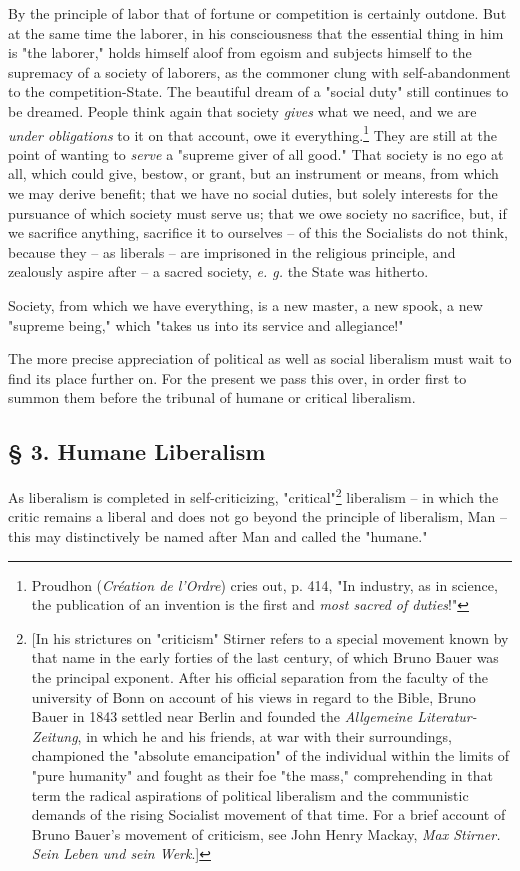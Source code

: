 By the principle of labor that of fortune or competition is certainly outdone. 
But at the same time the laborer, in his consciousness that the essential 
thing in him is "{}the laborer,"{} holds himself aloof from egoism and 
subjects himself to the supremacy of a society of laborers, as the commoner 
clung with self-abandonment to the competition-State. The beautiful dream of a 
"{}social duty"{} still continues to be dreamed. People think again that 
society \textit{gives} what we need, and we are \textit{under obligations} to 
it on that account, owe it everything.\footnote{Proudhon (\textit{Cr\'eation 
de l'Ordre}) cries out, p. 414, "{}In industry, as in science, the publication 
of an invention is the first and \textit{most sacred of duties}!"{}} They are 
still at the point of wanting to \textit{serve} a "{}supreme giver of all 
good."{} That society is no ego at all, which could give, bestow, or grant, 
but an instrument or means, from which we may derive benefit; that we have no 
social duties, but solely interests for the pursuance of which society must 
serve us; that we owe society no sacrifice, but, if we sacrifice anything, 
sacrifice it to ourselves -- of this the Socialists do not think, because they 
-- as liberals -- are imprisoned in the religious principle, and zealously 
aspire after -- a sacred society, \textit{e. g.} the State was hitherto.

Society, from which we have everything, is a new master, a new spook, a new 
"{}supreme being,"{} which "{}takes us into its service and allegiance!"{}

The more precise appreciation of political as well as social liberalism must 
wait to find its place further on. For the present we pass this over, in order 
first to summon them before the tribunal of humane or critical liberalism.

\subsection[\S{} 3. Humane Liberalism]{\centering \S{} 3. Humane Liberalism}

As liberalism is completed in self-criticizing, "{}critical"{}\footnote{[In 
his strictures on "{}criticism"{} Stirner refers to a special movement known 
by that name in the early forties of the last century, of which Bruno Bauer 
was the principal exponent. After his official separation from the faculty of 
the university of Bonn on account of his views in regard to the Bible, Bruno 
Bauer in 1843 settled near Berlin and founded the \textit{Allgemeine 
Literatur-Zeitung}, in which he and his friends, at war with their 
surroundings, championed the "{}absolute emancipation"{} of the individual 
within the limits of "{}pure humanity"{} and fought as their foe "{}the 
mass,"{} comprehending in that term the radical aspirations of political 
liberalism and the communistic demands of the rising Socialist movement of 
that time. For a brief account of Bruno Bauer's movement of criticism, see 
John Henry Mackay, \textit{Max Stirner. Sein Leben und sein Werk}.]} 
liberalism -- in which the critic remains a liberal and does not go beyond the 
principle of liberalism, Man -- this may distinctively be named after Man and 
called the "{}humane."{}

